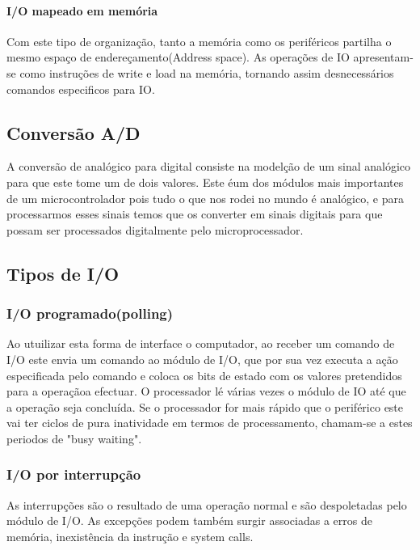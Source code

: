 \documentclass[10pt,a4paper]{paper}
\begin{document}
	\paragraph*{I/O mapeado em memória}
	
	Com este tipo de organização, tanto a memória como os periféricos partilha o mesmo espaço de endereçamento(Address space). As operações de IO apresentam-se como instruções de write e load na memória, tornando assim desnecessários comandos especificos para IO.
	
	\subsection*{Conversão A/D}
		
	A conversão de analógico para digital consiste na modelção de um sinal analógico para que este tome um de dois valores. Este éum dos módulos mais importantes de um microcontrolador pois tudo o que nos rodei no mundo é analógico, e para processarmos esses sinais temos que os converter em sinais digitais para que possam ser processados digitalmente pelo microprocessador.
	
	\subsection*{Tipos de I/O}
	
	\subsubsection*{I/O programado(polling)}
	
	Ao utuilizar esta forma de interface o computador, ao receber um comando de I/O este envia um comando ao módulo de I/O, que por sua vez executa a ação especificada pelo comando e coloca os bits de estado com os valores pretendidos para a operaçãoa efectuar. O processador lé várias vezes o módulo de IO até que a operação seja concluída.
	Se o processador for mais rápido que o periférico este vai ter ciclos de pura inatividade em termos de processamento, chamam-se a estes periodos de "busy waiting".
	
	\subsubsection*{I/O por interrupção}
	
	As interrupções são o resultado de uma operação normal e são despoletadas pelo módulo de I/O. As excepções podem também surgir associadas a erros de memória, inexistência da instrução  e system calls.
	
\end{document}
